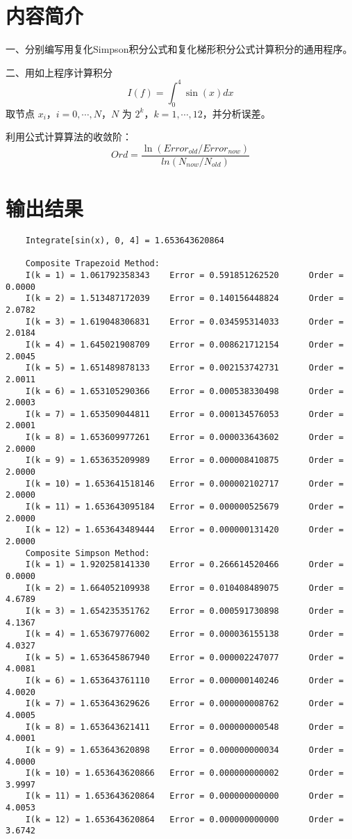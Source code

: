\documentclass{ctexart}
\begin{document}
\section*{内容简介}
	\noindent 一、分别编写用复化Simpson积分公式和复化梯形积分公式计算积分的通用程序。
	
	\noindent 二、用如上程序计算积分
	\begin{equation}
		I(f) = \int_0^4\sin(x)dx
	\end{equation}
	取节点 $x_i$，$i = 0, \cdots, N$，$N$ 为 $2^k$，$k = 1, \cdots, 12$，并分析误差。
	
	\noindent 利用公式计算算法的收敛阶：
	\begin{equation}
		Ord = \dfrac{\ln(Error_{old} /Error_{now})}{ln(N_{now} /N_{old})}
	\end{equation}

\section*{输出结果}

\begin{verbatim}
	Integrate[sin(x), 0, 4] = 1.653643620864
	
	Composite Trapezoid Method:
	I(k = 1) = 1.061792358343 	 Error = 0.591851262520 	 Order = 0.0000
	I(k = 2) = 1.513487172039 	 Error = 0.140156448824 	 Order = 2.0782
	I(k = 3) = 1.619048306831 	 Error = 0.034595314033 	 Order = 2.0184
	I(k = 4) = 1.645021908709 	 Error = 0.008621712154 	 Order = 2.0045
	I(k = 5) = 1.651489878133 	 Error = 0.002153742731 	 Order = 2.0011
	I(k = 6) = 1.653105290366 	 Error = 0.000538330498 	 Order = 2.0003
	I(k = 7) = 1.653509044811 	 Error = 0.000134576053 	 Order = 2.0001
	I(k = 8) = 1.653609977261 	 Error = 0.000033643602 	 Order = 2.0000
	I(k = 9) = 1.653635209989 	 Error = 0.000008410875 	 Order = 2.0000
	I(k = 10) = 1.653641518146 	 Error = 0.000002102717 	 Order = 2.0000
	I(k = 11) = 1.653643095184 	 Error = 0.000000525679 	 Order = 2.0000
	I(k = 12) = 1.653643489444 	 Error = 0.000000131420 	 Order = 2.0000
	Composite Simpson Method:
	I(k = 1) = 1.920258141330 	 Error = 0.266614520466 	 Order = 0.0000
	I(k = 2) = 1.664052109938 	 Error = 0.010408489075 	 Order = 4.6789
	I(k = 3) = 1.654235351762 	 Error = 0.000591730898 	 Order = 4.1367
	I(k = 4) = 1.653679776002 	 Error = 0.000036155138 	 Order = 4.0327
	I(k = 5) = 1.653645867940 	 Error = 0.000002247077 	 Order = 4.0081
	I(k = 6) = 1.653643761110 	 Error = 0.000000140246 	 Order = 4.0020
	I(k = 7) = 1.653643629626 	 Error = 0.000000008762 	 Order = 4.0005
	I(k = 8) = 1.653643621411 	 Error = 0.000000000548 	 Order = 4.0001
	I(k = 9) = 1.653643620898 	 Error = 0.000000000034 	 Order = 4.0000
	I(k = 10) = 1.653643620866 	 Error = 0.000000000002 	 Order = 3.9997
	I(k = 11) = 1.653643620864 	 Error = 0.000000000000 	 Order = 4.0053
	I(k = 12) = 1.653643620864 	 Error = 0.000000000000 	 Order = 3.6742
\end{verbatim}
\end{document}
